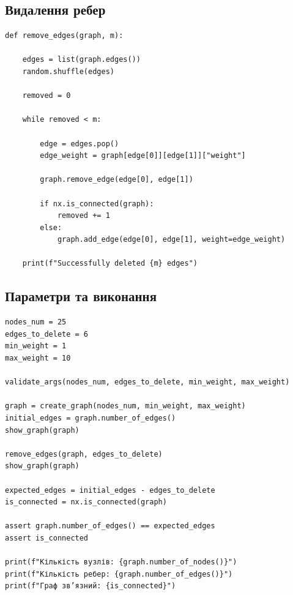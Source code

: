 \documentclass[12pt,a4paper]{article}
\begin{document}
\subsection{Видалення ребер}

\begin{listing}[H]
\begin{verbatim}
def remove_edges(graph, m):

    edges = list(graph.edges())
    random.shuffle(edges)

    removed = 0

    while removed < m:

        edge = edges.pop()
        edge_weight = graph[edge[0]][edge[1]]["weight"]

        graph.remove_edge(edge[0], edge[1])

        if nx.is_connected(graph):
            removed += 1
        else:
            graph.add_edge(edge[0], edge[1], weight=edge_weight)

    print(f"Successfully deleted {m} edges")
\end{verbatim}
\caption{Функція видалення ребер зі збереженням зв'язності}
\end{listing}

\subsection{Параметри та виконання}

\begin{listing}[H]
\begin{verbatim}
nodes_num = 25
edges_to_delete = 6
min_weight = 1
max_weight = 10

validate_args(nodes_num, edges_to_delete, min_weight, max_weight)

graph = create_graph(nodes_num, min_weight, max_weight)
initial_edges = graph.number_of_edges()
show_graph(graph)

remove_edges(graph, edges_to_delete)
show_graph(graph)

expected_edges = initial_edges - edges_to_delete
is_connected = nx.is_connected(graph)

assert graph.number_of_edges() == expected_edges
assert is_connected

print(f"Кількість вузлів: {graph.number_of_nodes()}")
print(f"Кількість ребер: {graph.number_of_edges()}")
print(f"Граф зв’язний: {is_connected}")
\end{verbatim}
\caption{Параметри генерації, виконання та підсумкова перевірка}
\end{listing}
\end{document}
